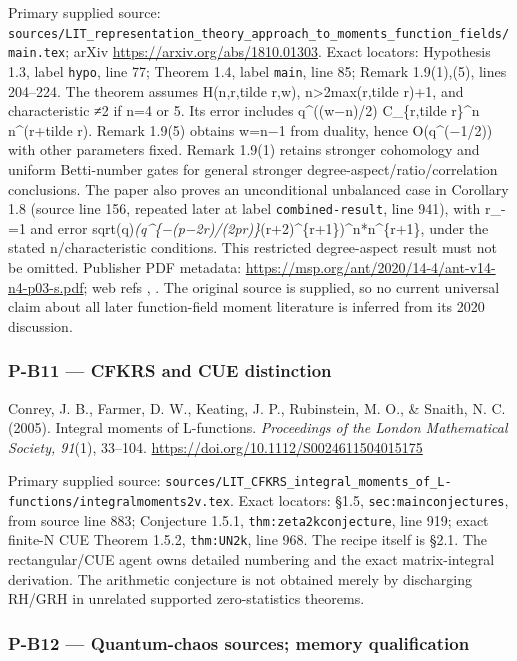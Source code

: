 \documentclass[11pt,a4paper]{article}
\theoremstyle{definition}\newtheorem{definition}{Definition}
\begin{document}
Primary supplied source:
\nolinkurl{sources/LIT_representation_theory_approach_to_moments_function_fields/main.tex};
arXiv \url{https://arxiv.org/abs/1810.01303}. Exact locators: Hypothesis
1.3, label \nolinkurl{hypo}, line 77; Theorem 1.4, label \nolinkurl{main},
line 85; Remark 1.9(1),(5), lines 204--224. The theorem assumes
H(n,r,tilde r,w), n\textgreater2max(r,tilde r)+1, and characteristic ≠2
if n=4 or 5. Its error includes q\^{}((w−n)/2) C\_\{r,tilde r\}\^{}n
n\^{}(r+tilde r). Remark 1.9(5) obtains w=n−1 from duality, hence
O(q\^{}(−1/2)) with other parameters fixed. Remark 1.9(1) retains
stronger cohomology and uniform Betti-number gates for general stronger
degree-aspect/ratio/correlation conclusions. The paper also proves an
unconditional unbalanced case in Corollary 1.8 (source line 156,
repeated later at label \nolinkurl{combined-result}, line 941), with r\_-=1
and error
sqrt(q)\emph{(q\^{}\{−(p−2r)/(2pr)\}}(r+2)\^{}\{r+1\})\^{}n*n\^{}\{r+1\},
under the stated n/characteristic conditions. This restricted
degree-aspect result must not be omitted. Publisher PDF metadata:
\url{https://msp.org/ant/2020/14-4/ant-v14-n4-p03-s.pdf}; web refs , .
The original source is supplied, so no current universal claim about all
later function-field moment literature is inferred from its 2020
discussion.

\subsubsection{P-B11 --- CFKRS and CUE
distinction}\label{p-b11--cfkrs-and-cue-distinction}

Conrey, J. B., Farmer, D. W., Keating, J. P., Rubinstein, M. O., \&
Snaith, N. C. (2005). Integral moments of L-functions. \emph{Proceedings
of the London Mathematical Society, 91}(1), 33--104.
\url{https://doi.org/10.1112/S0024611504015175}

Primary supplied source:
\nolinkurl{sources/LIT_CFKRS_integral_moments_of_L-functions/integralmoments2v.tex}.
Exact locators: §1.5, \nolinkurl{sec:mainconjectures}, from source line
883; Conjecture 1.5.1, \nolinkurl{thm:zeta2kconjecture}, line 919; exact
finite-N CUE Theorem 1.5.2, \nolinkurl{thm:UN2k}, line 968. The recipe
itself is §2.1. The rectangular/CUE agent owns detailed numbering and
the exact matrix-integral derivation. The arithmetic conjecture is not
obtained merely by discharging RH/GRH in unrelated supported
zero-statistics theorems.

\subsubsection{P-B12 --- Quantum-chaos sources; memory
qualification}\label{p-b12--quantum-chaos-sources-memory-qualification}
\end{document}
